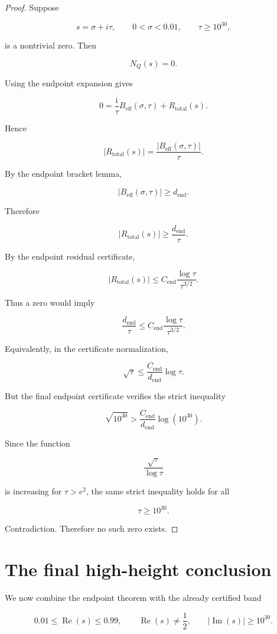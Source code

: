 \documentclass[11pt]{article}
\DeclareMathOperator{\Rea}{Re}
\DeclareMathOperator{\Ima}{Im}
\newcommand{\NQ}{N_Q}
\newcommand{\Beff}{B_{\mathrm{eff}}}
\newcommand{\Rtot}{R_{\mathrm{total}}}
\newcommand{\Cend}{C_{\mathrm{end}}}
\newcommand{\dend}{d_{\mathrm{end}}}
\newcommand{\ii}{\mathrm{i}}
\begin{document}
\begin{proof}
Suppose

\[
s=\sigma+i\tau,
\qquad
0<\sigma<0.01,
\qquad
\tau\geq10^{30},
\]

is a nontrivial zero.  Then

\[
\NQ(s)=0.
\]

Using the endpoint expansion gives

\[
0=\frac{\ii}{\tau}\Beff(\sigma,\tau)+\Rtot(s).
\]

Hence

\[
|\Rtot(s)|
=
\frac{|\Beff(\sigma,\tau)|}{\tau}.
\]

By the endpoint bracket lemma,

\[
|\Beff(\sigma,\tau)|\geq\dend.
\]

Therefore

\[
|\Rtot(s)|\geq\frac{\dend}{\tau}.
\]

By the endpoint residual certificate,

\[
|\Rtot(s)|
\leq
\Cend\frac{\log\tau}{\tau^{3/2}}.
\]

Thus a zero would imply

\[
\frac{\dend}{\tau}
\leq
\Cend\frac{\log\tau}{\tau^{3/2}}.
\]

Equivalently, in the certificate normalization,

\[
\sqrt{\tau}
\leq
\frac{\Cend}{\dend}\log\tau.
\]

But the final endpoint certificate verifies the strict inequality

\[
\sqrt{10^{30}}
>
\frac{\Cend}{\dend}\log(10^{30}).
\]

Since the function

\[
\frac{\sqrt{\tau}}{\log\tau}
\]

is increasing for \(\tau>e^2\), the same strict inequality holds for all

\[
\tau\geq10^{30}.
\]

Contradiction.  Therefore no such zero exists.
\end{proof}

\section{The final high-height conclusion}

We now combine the endpoint theorem with the already certified band

\[
0.01\leq\Rea(s)\leq0.99,
\qquad
\Rea(s)\neq\frac12,
\qquad
|\Ima(s)|\geq10^{30}.
\]
\end{document}
